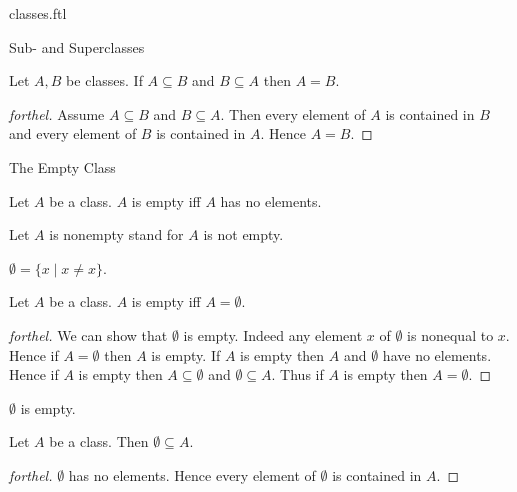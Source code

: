\documentclass{naproche-library}
\begin{document}
\begin{smodule}[title=Classes]{classes.ftl}
\begin{sfragment}{Sub- and Superclasses}
  \begin{proposition}[forthel,id=FOUNDATIONS_01_7159957847801856]
    Let $A, B$ be classes.
    If $A \subseteq B$ and $B \subseteq A$ then $A = B$.
  \end{proposition}
  \begin{proof}[forthel]
    Assume $A \subseteq B$ and $B \subseteq A$.
    Then every element of $A$ is contained in $B$ and every element of $B$ is contained in $A$.
    Hence $A = B$.
  \end{proof}
\end{sfragment}

\begin{sfragment}{The Empty Class}
  \begin{definition}[forthel,id=FOUNDATIONS_01_6252477624090624]
    Let $A$ be a class.
    $A$ is empty iff $A$ has no elements.

    Let $A$ is nonempty stand for $A$ is not empty.
  \end{definition}

  \begin{definition}[forthel,id=FOUNDATIONS_01_7939928493129728]
    $\emptyset = \{ x \mid x \neq x \}$.
  \end{definition}

  \begin{proposition}[forthel,id=FOUNDATIONS_01_2263153161273344]
    Let $A$ be a class.
    $A$ is empty iff $A = \emptyset$.
  \end{proposition}
  \begin{proof}[forthel]
    We can show that $\emptyset$ is empty.
    Indeed any element $x$ of $\emptyset$ is nonequal to $x$.
    Hence if $A = \emptyset$ then $A$ is empty.
    If $A$ is empty then $A$ and $\emptyset$ have no elements.
    Hence if $A$ is empty then $A \subseteq \emptyset$ and $\emptyset \subseteq A$.
    Thus if $A$ is empty then $A = \emptyset$.
  \end{proof}

  \begin{corollary}[forthel,id=FOUNDATIONS_01_1495141426659328]
    $\emptyset$ is empty.
  \end{corollary}

  \begin{corollary}[forthel,id=FOUNDATIONS_01_6931785090859008]
    Let $A$ be a class.
    Then $\emptyset \subseteq A$.
  \end{corollary}
  \begin{proof}[forthel]
    $\emptyset$ has no elements.
    Hence every element of $\emptyset$ is contained in $A$.
  \end{proof}
\end{sfragment}


\end{smodule}
\end{document}
